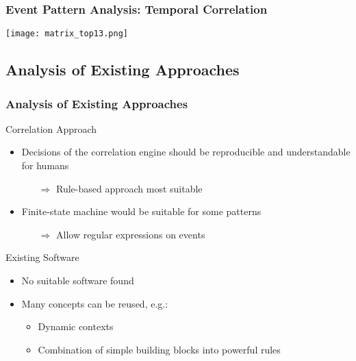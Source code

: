 \documentclass[10pt]{beamer}
\begin{document}
\begin{frame}
	\frametitle{Event Pattern Analysis: Temporal Correlation}
	\vspace{-0.4cm}\begin{center}\texttt{[image: matrix\_top13.png]}\end{center}
\end{frame}


\subsection{Analysis of Existing Approaches}
\begin{frame}
	\frametitle{Analysis of Existing Approaches}
	\begin{block}{Correlation Approach}
		\begin{itemize}
			\item Decisions of the correlation engine should be
				reproducible and understandable for humans
				\begin{itemize}
					\item[$\Rightarrow$] Rule-based approach most suitable
				\end{itemize}
			\item Finite-state machine would be suitable for some patterns
				\begin{itemize}
					\item[$\Rightarrow$] Allow regular expressions on events
				\end{itemize}
		\end{itemize}
	\end{block}

	\begin{block}{Existing Software}	
		\begin{itemize}
			\item No suitable software found
			\item Many concepts can be reused, e.g.:
				\begin{itemize}
					\item Dynamic contexts%
					\item Combination of simple building blocks into powerful
						rules
				\end{itemize}
		\end{itemize}
	\end{block}
\end{frame}
\end{document}
